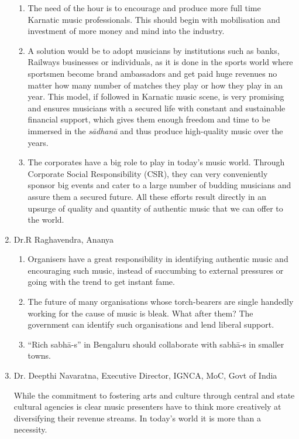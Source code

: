 \begin{enumerate}
\begin{enumerate}
 \item The need of the hour is to encourage and produce more full time Karnatic music professionals. This should begin with mobilisation and investment of more money and mind into the industry.

 \item A solution would be to adopt musicians by institutions such as banks, Railways businesses or individuals, as it is done in the sports world where sportsmen become brand ambassadors and get paid huge revenues no matter how many number of matches they play or how they play in an year. This model, if followed in Karnatic music scene, is very promising and ensures musicians with a secured life with constant and sustainable financial support, which gives them enough freedom and time to be immersed in the \textit{sādhanā} and thus produce high-quality music over the years.

 \item The corporates have a big role to play in today’s music world. Through Corporate Social Responsibility (CSR), they can very conveniently sponsor big events and cater to a large number of budding musicians and assure them a secured future. All these efforts result directly in an upsurge of quality and quantity of authentic music that we can offer to the world.
\end{enumerate}

 \newpage

 \item Dr.R Raghavendra, Ananya
 
\begin{enumerate}
\itemsep=0pt
\item Organisers have a great responsibility in identifying authentic music and encouraging such music, instead of succumbing to external pressures or going with the trend to get instant fame.

 \item The future of many organisations whose torch-bearers are single handedly working for the cause of music is bleak. What after them? The government can identify such organisations and lend liberal support.

 \item “Rich sabhā-s” in Bengaluru should collaborate with sabhā-s in smaller towns.
\end{enumerate}

 \item 
 Dr. Deepthi Navaratna, Executive Director, IGNCA, MoC, Govt of India

 While the commitment to fostering arts and culture through central and state cultural agencies is clear music presenters have to think more creatively at diversifying their revenue streams. In today’s world it is more than a necessity.

\end{enumerate}


